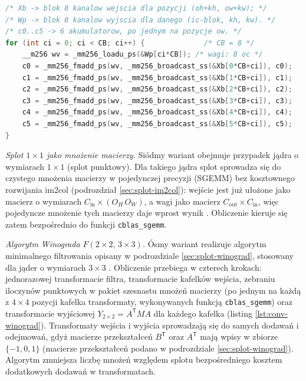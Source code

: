 \documentclass[a4paper,12pt]{book} %
\begin{document}
\begin{lstfloat}[t!]
\begin{lstlisting}[language=C, caption={Splot --- pętla wewnętrzna mikrojądra w układzie NCHWc8: jeden rejestr wag \texttt{wv} (osiem kanałów wyjścia), sześć powieleń wartości wejścia (po jednej na pozycję \texttt{ow}) i sześć instrukcji FMA do sześciu akumulatorów \texttt{c0}--\texttt{c5} w każdym kroku po kanale wejścia}, label={lst:conv-nchwc}]
/* Xb -> blok 8 kanalow wejscia dla pozycji (oh+kh, ow+kw); */
/* Wp -> blok 8 kanalow wyjscia dla danego (ic-blok, kh, kw). */
/* c0..c5 -> 6 akumulatorow, po jednym na pozycje ow. */
for (int ci = 0; ci < CB; ci++) {              /* CB = 8 */
    __m256 wv = _mm256_loadu_ps(&Wp[ci*CB]); /* wagi: 8 oc */
    c0 = _mm256_fmadd_ps(wv, _mm256_broadcast_ss(&Xb[0*CB+ci]), c0);
    c1 = _mm256_fmadd_ps(wv, _mm256_broadcast_ss(&Xb[1*CB+ci]), c1);
    c2 = _mm256_fmadd_ps(wv, _mm256_broadcast_ss(&Xb[2*CB+ci]), c2);
    c3 = _mm256_fmadd_ps(wv, _mm256_broadcast_ss(&Xb[3*CB+ci]), c3);
    c4 = _mm256_fmadd_ps(wv, _mm256_broadcast_ss(&Xb[4*CB+ci]), c4);
    c5 = _mm256_fmadd_ps(wv, _mm256_broadcast_ss(&Xb[5*CB+ci]), c5);
}
\end{lstlisting}
\end{lstfloat}

\emph{Splot $1 \times 1$ jako mnożenie macierzy.} Siódmy wariant obejmuje przypadek jądra o wymiarach $1 \times 1$ (splot punktowy). Dla takiego jądra splot sprowadza się do czystego mnożenia macierzy w pojedynczej precyzji (SGEMM) bez kosztownego rozwijania im2col (podrozdział \ref{sec:splot-im2col}): wejście jest już ułożone jako macierz o wymiarach $C_{\mathrm{in}} \times (O_H\, O_W)$, a wagi jako macierz $C_{\mathrm{out}} \times C_{\mathrm{in}}$, więc pojedyncze mnożenie tych macierzy daje wprost wynik \cite{vasudevan2017mcmk}. Obliczenie kieruje się zatem bezpośrednio do funkcji \texttt{cblas\_sgemm}.

\emph{Algorytm Winograda $F(2 \times 2,\, 3 \times 3)$.} Ósmy wariant realizuje algorytm minimalnego filtrowania opisany w podrozdziale \ref{sec:splot-winograd}, stosowany dla jąder o wymiarach $3 \times 3$ \cite{lavin2016fast}. Obliczenie przebiega w czterech krokach: jednorazowej transformacie filtra, transformacie kafelków wejścia, zebraniu iloczynów punktowych w pakiet szesnastu mnożeń macierzy (po jednym na każdą z $4 \times 4$ pozycji kafelka transformaty, wykonywanych funkcją \texttt{cblas\_sgemm}) oraz transformacie wyjściowej $Y_{2 \times 2} = A^{\mathsf{T}} M A$ dla każdego kafelka (listing \ref{lst:conv-winograd}). Transformaty wejścia i wyjścia sprowadzają się do samych dodawań i odejmowań, gdyż macierze przekształceń $B^{\mathsf{T}}$ oraz $A^{\mathsf{T}}$ mają wpisy w zbiorze $\{-1, 0, 1\}$ (macierze przekształceń podano w podrozdziale \ref{sec:splot-winograd}). Algorytm zmniejsza liczbę mnożeń względem splotu bezpośredniego kosztem dodatkowych dodawań w transformatach.
\end{document}
